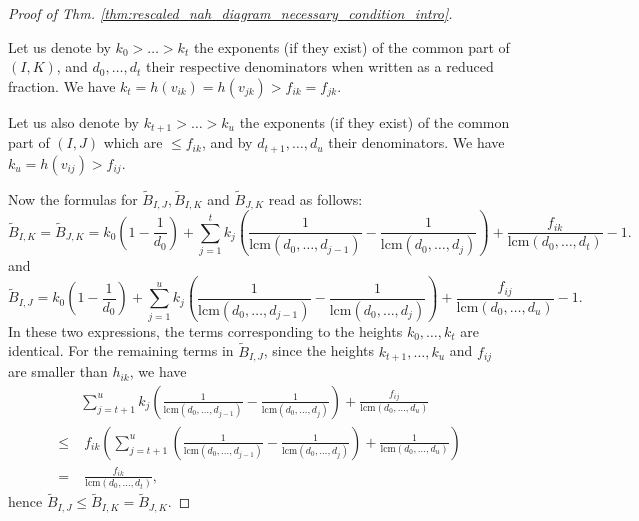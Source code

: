 \documentclass[11pt,a4paper]{amsart}
\numberwithin{equation}{section}
\begin{document}
\begin{proof}[Proof of Thm. \ref{thm:rescaled_nah_diagram_necessary_condition_intro}]
\begin{center}
\end{center}

Let us denote by $k_0>\dots > k_t$ the exponents (if they exist) of the common part of $(I,K)$, and $d_0, \dots, d_t$ their respective denominators when written as a reduced fraction. We have $k_t= h(v_{ik})=h(v_{jk})>f_{ik}=f_{jk}$.

Let us also denote by $k_{t+1}>\dots> k_u$ the exponents (if they exist) of the common part of $(I,J)$ which are $\leq f_{ik}$, and by $d_{t+1}, \dots, d_u$ their denominators. We have $k_u=h(v_{ij})>f_{ij}$.

Now the formulas for $\widetilde B_{I,J}, \widetilde B_{I,K}$ and $\widetilde B_{J,K}$ read as follows:
\[
\widetilde B_{I,K}=\widetilde B_{J,K}=k_0(1-\frac{1}{d_0})+ \sum_{j=1}^t  k_j\left(\frac{1}{\mathrm{lcm}(d_0, \dots, d_{j-1})}-\frac{1}{\mathrm{lcm}(d_0, \dots, d_{j})}\right)+\frac{f_{ik}}{\mathrm{lcm}(d_0, \dots, d_{t})}-1.
\]
and
\[
\widetilde B_{I,J}=k_0(1-\frac{1}{d_0})+ \sum_{j=1}^u  k_j\left(\frac{1}{\mathrm{lcm}(d_0, \dots, d_{j-1})}-\frac{1}{\mathrm{lcm}(d_0, \dots, d_{j})}\right)+\frac{f_{ij}}{\mathrm{lcm}(d_0, \dots, d_{u})}-1.
\]
In these two expressions, the terms corresponding to the heights $k_0, \dots, k_t$ are identical. For the remaining terms in $\widetilde B_{I,J}$, since the heights $k_{t+1}, \dots, k_u$ and $f_{ij}$ are smaller than $h_{ik}$, we have
\begin{align*}
&\sum_{j=t+1}^u  k_j\left(\frac{1}{\mathrm{lcm}(d_0, \dots, d_{j-1})}-\frac{1}{\mathrm{lcm}(d_0, \dots, d_{j})}\right)+\frac{f_{ij}}{\mathrm{lcm}(d_0, \dots, d_{u})}\\
\leq & \;f_{ik}\left(\sum_{j=t+1}^u  \left(\frac{1}{\mathrm{lcm}(d_0, \dots, d_{j-1})}-\frac{1}{\mathrm{lcm}(d_0, \dots, d_{j})}\right)+\frac{1}{\mathrm{lcm}(d_0, \dots, d_{u})}\right)\\
=& \;\frac{f_{ik}}{\mathrm{lcm}(d_0, \dots, d_{t})},
\end{align*}
hence $\widetilde B_{I,J}\leq \widetilde B_{I,K}=\widetilde B_{J,K}$.


\end{proof}
\end{document}
